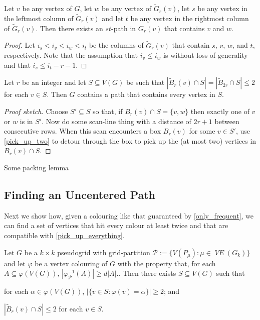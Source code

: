 \documentclass{patmorin}
\DeclareMathOperator{\VE}{\mathit{VE}}
\begin{document}
\begin{lem}\label{pick_up_two}
  Let $v$ be any vertex of $G$, let $w$ be any vertex of $\tilde{G}_r(v)$, let $s$ be any vertex in the leftmost column of $\tilde{G}_r(v)$ and let $t$ be any vertex in the rightmost column of $\tilde{G}_r(v)$.  Then there exists an $st$-path in $G_r(v)$ that contains $v$ and $w$.
\end{lem}

\begin{proof}
  Let $i_s \le i_v \le i_w \le i_t$ be the columns of $\tilde{G}_r(v)$ that contain $s$, $v$, $w$, and $t$, respectively.  Note that the assumption that $i_v \le i_w$ is without loss of generality and that $i_s \le i_t - r -1$.
\end{proof}

\begin{lem}\label{pick_up_everything}
  Let $r$ be an integer and let $S\subseteq V(G)$ be such that $|\tilde{B}_{r}(v)\cap S|=|\tilde{B}_{2r}\cap S|\le 2$ for each $v\in S$.  Then $G$ contains a path that contains every vertex in $S$. 
\end{lem}

\begin{proof}[Proof sketch]
  Choose $S'\subseteq S$ so that, if $B_r(v)\cap S=\{v,w\}$ then exactly one of $v$ or $w$ is in $S'$. Now do some scan-line thing with a distance of $2r+1$ between consecutive rows.  When this scan encounters a box $B_r(v)$ for some $v\in S'$, use \cref{pick_up_two} to detour through the box to pick up the (at most two) vertices in $B_r(v)\cap S$.
\end{proof}

\begin{lem}\label{packing_lemma}
  Some packing lemma
\end{lem}

\subsection{Finding an Uncentered Path}

Next we show how, given a colouring like that guaranteed by \cref{only_frequent}, we can find a set of vertices that hit every colour at least twice and that are compatible with \cref{pick_up_everything}.

\begin{lem}
  Let $G$ be a $k\times k$ pseudogrid with grid-partition $\mathcal{P}:=\{V(P_\mu):\mu\in\VE(G_k)\}$ and let $\varphi$ be a vertex colouring of $G$ with the property that, for each $A\subseteq\varphi(V(G))$, $|\varphi_{\mathcal{P}}^{-1}(A)|\ge d|A|$..
  Then there exists $S\subseteq V(G)$ such that
  \begin{compactenum}[(i)]
    \item \label{hits_both} for each $\alpha\in\varphi(V(G))$, $|\{v\in S:\varphi(v)=\alpha\}|\ge 2$; and
    \item \label{spread_out} $|\tilde{B}_r(v)\cap S|\le 2$ for each $v\in S$.
  \end{compactenum}
\end{lem}
\end{document}
